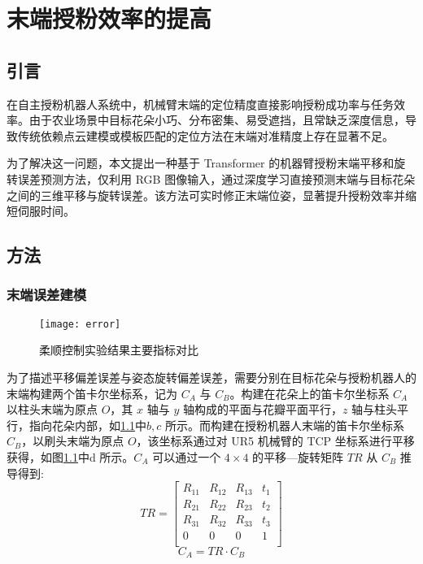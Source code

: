 
\chapter{末端授粉效率的提高}\label{ch:6}
\section{引言}

在自主授粉机器人系统中，机械臂末端的定位精度直接影响授粉成功率与任务效率。由于农业场景中目标花朵小巧、分布密集、易受遮挡，且常缺乏深度信息，导致传统依赖点云建模或模板匹配的定位方法在末端对准精度上存在显著不足。

为了解决这一问题，本文提出一种基于 Transformer 的机器臂授粉末端平移和旋转误差预测方法，仅利用 RGB 图像输入，通过深度学习直接预测末端与目标花朵之间的三维平移与旋转误差。该方法可实时修正末端位姿，显著提升授粉效率并缩短伺服时间。

\section{方法}

\subsection{末端误差建模}
\begin{figure}[htb]
	\texttt{[image: error]}
	\caption[授粉实验结果主要指标对比]{柔顺控制实验结果主要指标对比} %
	\label{fig:effective1}
\end{figure}


为了描述平移偏差误差与姿态旋转偏差误差，需要分别在目标花朵与授粉机器人的末端构建两个笛卡尔坐标系，记为 $C_{A}$ 与 $C_{B}$。构建在花朵上的笛卡尔坐标系 $C_{A}$ 以柱头末端为原点 $O$，其 $x$ 轴与 $y$ 轴构成的平面与花瓣平面平行，$z$ 轴与柱头平行，指向花朵内部，如\cref{fig:effective1}中$b,c$ 所示。而构建在授粉机器人末端的笛卡尔坐标系 $C_{B}$，以刷头末端为原点 $O$，该坐标系通过对 UR5 机械臂的 TCP 坐标系进行平移获得，如图\cref{fig:effective1}中d 所示。$C_{A}$ 可以通过一个 $4\times4$ 的平移—旋转矩阵 $TR$ 从 $C_{B}$ 推导得到:
\begin{equation}
	\label{eq0_1}
	TR=
	\begin{bmatrix}
		R_{11} & R_{12} & R_{13} & t_{1} \\
		R_{21} & R_{22} & R_{23} & t_{2} \\
		R_{31} & R_{32} & R_{33} & t_{3} \\
		0 & 0 & 0 & 1 \\
	\end{bmatrix}
\end{equation}
\begin{equation}
	\label{eq0_2}
	C_{A} = TR\cdot C_{B}
\end{equation}


